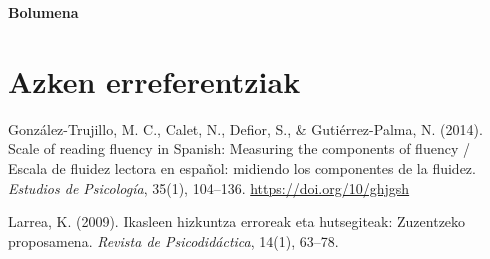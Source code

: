 \documentclass[
]{book}
\begin{document}
\textbf{Bolumena}

\hypertarget{azken-erreferentziak}{%
\section{Azken erreferentziak}\label{azken-erreferentziak}}

González-Trujillo, M. C., Calet, N., Defior, S., \& Gutiérrez-Palma, N. (2014). Scale of reading fluency in Spanish: Measuring the components of fluency / Escala de fluidez lectora en español: midiendo los componentes de la fluidez. \emph{Estudios de Psicología}, 35(1), 104--136. \url{https://doi.org/10/ghjgsh}

Larrea, K. (2009). Ikasleen hizkuntza erroreak eta hutsegiteak: Zuzentzeko proposamena. \emph{Revista de Psicodidáctica}, 14(1), 63--78.
\end{document}
